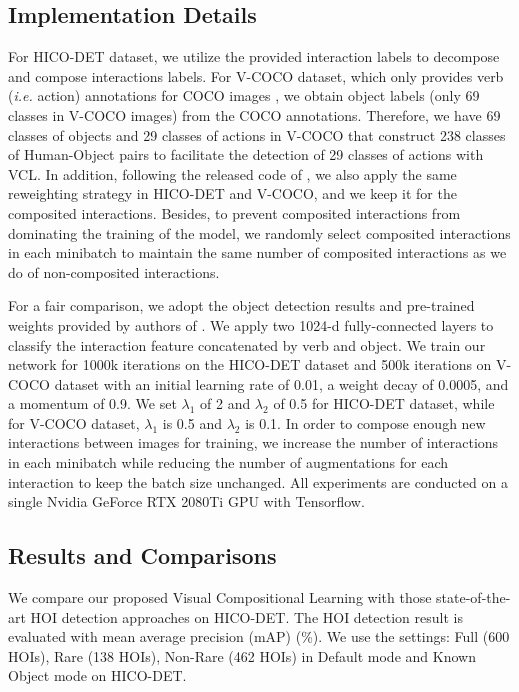 \documentclass[runningheads]{llncs}
\newcommand{\ie}{\textit{i.e. }}
\begin{document}
\subsection{Implementation Details}


For HICO-DET dataset, we utilize the provided interaction labels to decompose and compose interactions labels.
For V-COCO dataset, which only provides verb (\ie action) annotations for COCO images \cite{lin2014microsoft},
we obtain object labels (only 69 classes in V-COCO images) from the COCO annotations.
Therefore, we have 69 classes of objects and 29 classes of actions in V-COCO that construct 238 classes of
Human-Object pairs to facilitate the detection of 29 classes of actions with VCL.
In addition, following the released code of \cite{li2018transferable},
we also apply the same reweighting strategy in HICO-DET and V-COCO,
and we keep it for the composited interactions. Besides, to prevent composited interactions from dominating the training of the model,
we randomly select composited interactions in each minibatch to maintain the same number of composited interactions as we do of non-composited interactions.

For a fair comparison, we adopt the object detection results
and pre-trained weights provided by authors of \cite{gao2018ican}. We apply two 1024-d fully-connected layers to classify the
interaction feature concatenated by verb and object. We train our network for 1000k iterations on the
HICO-DET dataset and 500k iterations on V-COCO dataset with an initial learning rate of 0.01, a weight decay of 0.0005, and a momentum of 0.9.
We set $\lambda_1$ of 2 and $\lambda_2$ of 0.5 for HICO-DET dataset,
while for V-COCO dataset, $\lambda_1$ is 0.5 and $\lambda_2$ is 0.1. In order to compose enough new interactions between images for training,
we increase the number of interactions in each minibatch while reducing the number of augmentations for each interaction to keep the batch size unchanged.
All experiments are conducted on a single Nvidia GeForce RTX 2080Ti GPU with Tensorflow.



\subsection{Results and Comparisons}

We compare our proposed Visual Compositional Learning with
those state-of-the-art HOI detection approaches \cite{qi2018learning, gao2018ican, li2018transferable, gupta2018no, wang2019deep, xu2019learning, wan2019pose, Peyre_2019_ICCV, bansal2019detecting}
on HICO-DET. The HOI detection result is evaluated with mean average precision (mAP) (\%). We use the settings: Full (600 HOIs), Rare (138 HOIs), Non-Rare (462 HOIs) in Default mode and Known Object mode on HICO-DET.
\end{document}
